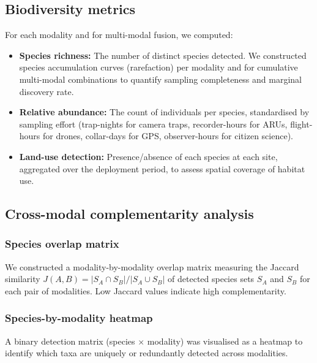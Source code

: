 \documentclass[12pt]{article}
\begin{document}

\subsection{Biodiversity metrics}

For each modality and for multi-modal fusion, we computed:

\begin{itemize}
    \item \textbf{Species richness:} The number of distinct species detected. We constructed species accumulation curves (rarefaction) per modality and for cumulative multi-modal combinations to quantify sampling completeness and marginal discovery rate.
    \item \textbf{Relative abundance:} The count of individuals per species, standardised by sampling effort (trap-nights for camera traps, recorder-hours for ARUs, flight-hours for drones, collar-days for GPS, observer-hours for citizen science).
    \item \textbf{Land-use detection:} Presence/absence of each species at each site, aggregated over the deployment period, to assess spatial coverage of habitat use.
\end{itemize}

\subsection{Cross-modal complementarity analysis}

\subsubsection{Species overlap matrix}

We constructed a modality-by-modality overlap matrix measuring the Jaccard similarity $J(A, B) = |S_A \cap S_B| / |S_A \cup S_B|$ of detected species sets $S_A$ and $S_B$ for each pair of modalities. Low Jaccard values indicate high complementarity.

\subsubsection{Species-by-modality heatmap}

A binary detection matrix (species $\times$ modality) was visualised as a heatmap to identify which taxa are uniquely or redundantly detected across modalities.
\end{document}
